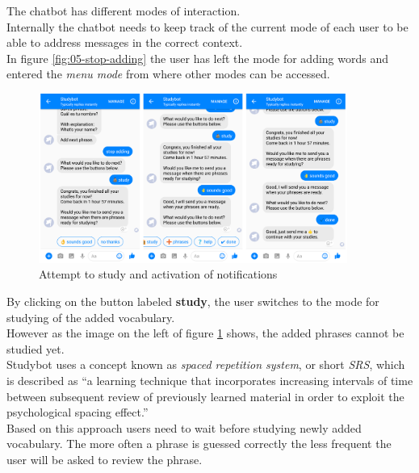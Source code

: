 The chatbot has different modes of interaction.
\\
Internally the chatbot needs to keep track of the current mode of each user to be able
to address messages in the correct context.
\\
In figure \ref{fig:05-stop-adding} the user has left the mode for adding words
and entered the \emph{menu mode} from where other modes can be accessed.
\\

\begin{figure}[h]
  \centering
  \includegraphics[width=0.9\textwidth]{images/interface/06-enable-notify.png}
	\caption{Attempt to study and activation of notifications}
	\label{fig:06-enable-notify}
\end{figure}

By clicking on the button labeled \textbf{study},
the user switches to the mode for studying of the added vocabulary.
\\
However as the image on the left of figure \ref{fig:06-enable-notify} shows,
the added phrases cannot be studied yet.
\\

Studybot uses a concept known as \emph{spaced repetition system}, or short \emph{SRS},
which is described as ``a learning technique that incorporates increasing intervals of time between subsequent review of previously learned material in order to exploit the psychological spacing effect.''\cite{srs}
\\
Based on this approach users need to wait before studying newly added vocabulary.
The more often a phrase is guessed correctly the less frequent the user will be asked to review the phrase.
\\

